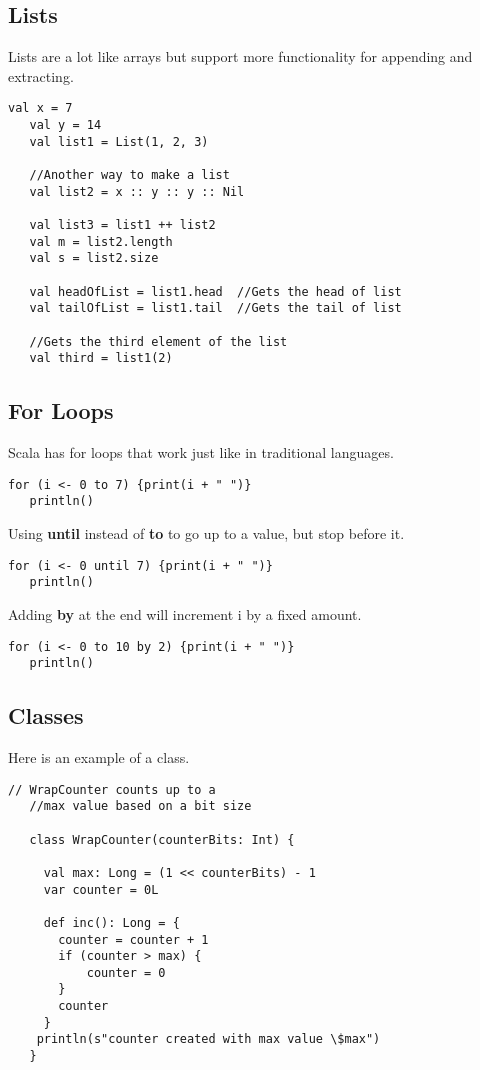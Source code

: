\documentclass[12pt, letterpaper]{report}
\begin{document}
\subsection{Lists}
Lists are a lot like arrays but support more functionality for appending and extracting.

\begin{lstlisting}[style=scala]
   val x = 7
   val y = 14
   val list1 = List(1, 2, 3)
   
   //Another way to make a list
   val list2 = x :: y :: y :: Nil	

   val list3 = list1 ++ list2
   val m = list2.length
   val s = list2.size

   val headOfList = list1.head	//Gets the head of list
   val tailOfList = list1.tail	//Gets the tail of list

   //Gets the third element of the list
   val third = list1(2)			
\end{lstlisting}

\subsection{For Loops}
Scala has for loops that work just like in traditional languages.

\begin{lstlisting}[style=scala]
   for (i <- 0 to 7) {print(i + " ")}
   println()
\end{lstlisting}

Using \textbf{until} instead of \textbf{to} to go up to a value, but stop before it.
 
\begin{lstlisting}[style=scala]
   for (i <- 0 until 7) {print(i + " ")}
   println()
\end{lstlisting}

Adding \textbf{by} at the end will increment i by a fixed amount.

\begin{lstlisting}[style=scala]
   for (i <- 0 to 10 by 2) {print(i + " ")}
   println()
\end{lstlisting}
\pagebreak
\subsection{Classes}
Here is an example of a class.

\begin{lstlisting}[style=scala]
   // WrapCounter counts up to a 
   //max value based on a bit size

   class WrapCounter(counterBits: Int) {

     val max: Long = (1 << counterBits) - 1
     var counter = 0L
    
     def inc(): Long = {
       counter = counter + 1
       if (counter > max) {
           counter = 0
       }
       counter
     }
    println(s"counter created with max value \$max")
   }
\end{lstlisting}
\end{document}
